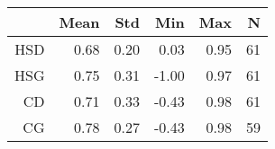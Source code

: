 \begin{tabular}{rrrrrr}
\hline
 & Mean & Std & Min & Max & N \\ 
\hline
HSD & 0.68 & 0.20 & 0.03 & 0.95 & 61 \\ 
HSG & 0.75 & 0.31 & -1.00 & 0.97 & 61 \\ 
CD & 0.71 & 0.33 & -0.43 & 0.98 & 61 \\ 
CG & 0.78 & 0.27 & -0.43 & 0.98 & 59 \\ 
\hline
\end{tabular}%
